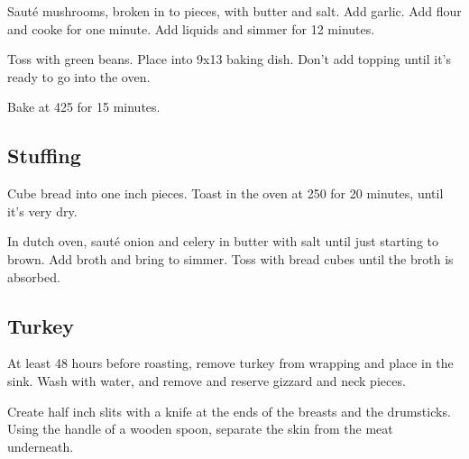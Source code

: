 \begin{recipe}
Sauté mushrooms, broken in to pieces, with butter and salt. Add garlic. Add flour and cooke for one minute. Add liquids and simmer for 12 minutes.

Toss with green beans. Place into 9x13 baking dish. Don't add topping until it's ready to go into the oven.

Bake at 425 for 15 minutes.

\subsection{Stuffing}



Cube bread into one inch pieces. Toast in the oven at 250\degree{} for 20 minutes, until it's very dry.



In dutch oven, sauté onion and celery in butter with salt until just starting to brown. Add broth and bring to simmer. Toss with bread cubes until the broth is absorbed.

\subsection{Turkey}



At least 48 hours before roasting, remove turkey from wrapping and place in the sink. Wash with water, and remove and reserve gizzard and neck pieces.

Create half inch slits with a knife at the ends of the breasts and the drumsticks. Using the handle of a wooden spoon, separate the skin from the meat underneath.


\end{recipe}
